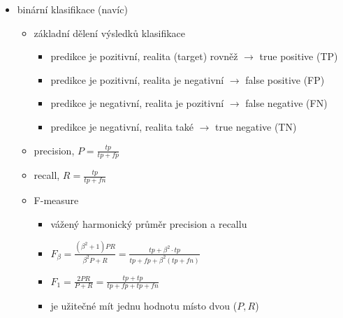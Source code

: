 \begin{itemize}
\begin{itemize}
\begin{itemize}
\begin{itemize}
\item nevhodná metrika, pokud jsou třídy nevyvážené (např. testujeme vzácné onemocnění)
\end{itemize}
\item confusion matrix
\begin{itemize}
\item řádky jsou označeny pravdivými hodnotami, sloupce predikovanými hodnotami (nebo naopak - je to potřeba uvést)
\item v každé buňce je počet testovacích dat s konkrétní kombinací targetu a predikce
\item na diagonále jsou tedy počty správně klasifikovaných testovacích dat
\item při binární klasifikaci buňky vlastně obsahují počty TP, FN, FP, TN
\item \href{https://www.evidentlyai.com/classification-metrics/confusion-matrix#how-to-read-a-confusion-matrix}{[obr.: confusion matrix]}
\end{itemize}
\end{itemize}
\item binární klasifikace (navíc)
\begin{itemize}
\item základní dělení výsledků klasifikace
\begin{itemize}
\item predikce je pozitivní, realita (target) rovněž $\to$ true positive (TP)
\item predikce je pozitivní, realita je negativní $\to$ false positive (FP)
\item predikce je negativní, realita je pozitivní $\to$ false negative (FN)
\item predikce je negativní, realita také $\to$ true negative (TN)
\end{itemize}
\item precision, $P=\frac{tp}{tp+fp}$
\item recall, $R=\frac{tp}{tp+fn}$
\item F-measure
\begin{itemize}
\item vážený harmonický průměr precision a recallu
\item $F_\beta=\frac{(\beta^2+1)PR}{\beta^2P+R}=\frac{tp+\beta^2\cdot tp}{tp+fp+\beta^2(tp+fn)}$
\item $F_1=\frac{2PR}{P+R}=\frac{tp+tp}{tp+fp+tp+fn}$
\item je užitečné mít jednu hodnotu místo dvou ($P,R$)
\end{itemize}

\end{itemize}
\end{itemize}
\end{itemize}

